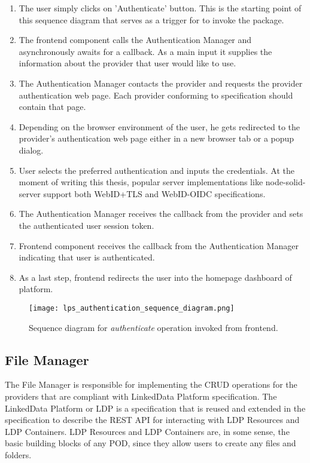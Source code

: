 \begin{enumerate}
    \item The user simply clicks on 'Authenticate' button. This is the starting point of this sequence diagram that serves as a trigger for \lpa{} to invoke the \lpa{} package.
    \item The frontend component calls the Authentication Manager and asynchronously awaits for a callback. As a main input it supplies the information about the \solid{} provider that user would like to use.
    \item The Authentication Manager contacts the \solid{} provider and requests the provider authentication web page. Each provider conforming to \solid{} specification should contain that page.
    \item Depending on the browser environment of the user, he gets redirected to the provider's authentication web page either in a new browser tab or a popup dialog.
    \item User selects the preferred authentication and inputs the credentials. At the moment of writing this thesis, popular \solid{} server implementations like node-solid-server support both WebID+TLS and WebID-OIDC specifications.
    \item The Authentication Manager receives the callback from the provider and sets the authenticated user session token.
    \item Frontend component receives the callback from the Authentication Manager indicating that user is authenticated.
    \item As a last step, frontend redirects the user into the homepage dashboard of \lpa{} platform.
\end{enumerate}


\begin{figure}[h]
\centering
\texttt{[image: lps\_authentication\_sequence\_diagram.png]}
\caption{Sequence diagram for \textit{authenticate} operation invoked from \lpa{} frontend.}
\label{fig:lps_authentication_sequence_diagram}
\end{figure}


\subsection{File Manager}
The File Manager is responsible for implementing the CRUD operations for the \solid{}  providers that are compliant with LinkedData Platform specification. The LinkedData Platform or LDP is a specification that is reused and extended in the \solid{} specification to describe the REST API for interacting with LDP Resources and LDP Containers. LDP Resources and LDP Containers are, in some sense, the basic building blocks of any \solid{} POD, since they allow users to create any files and folders. 

